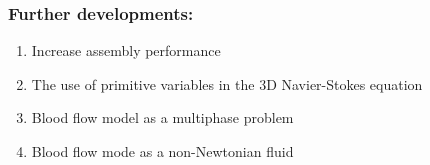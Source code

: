 
\begin{frame}
 \frametitle{\LARGE Further developments:}
 \vspace{-1cm}
\begin{enumerate}
 \justifying
 \small

 
 \item Increase assembly performance\\

 \vspace{0.3cm}

 \item The use of primitive variables in the 3D Navier-Stokes equation \\

 \vspace{0.3cm}

 \item Blood flow model as a multiphase problem \\

 \vspace{0.3cm}

 \item Blood flow mode as a non-Newtonian fluid
\end{enumerate}
\end{frame}

